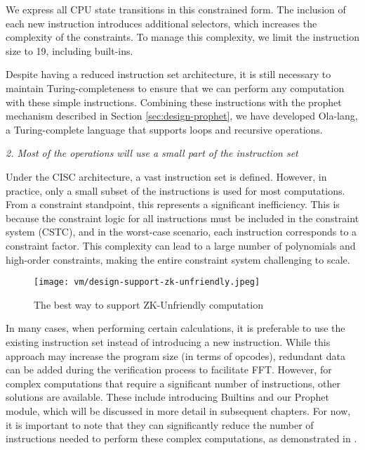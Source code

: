 We express all CPU state transitions in this constrained form. The inclusion of each new instruction introduces additional selectors, which increases the complexity of the constraints. 
To manage this complexity, we limit the instruction size to 19, including built-ins.

Despite having a reduced instruction set architecture, it is still necessary to maintain Turing-completeness to ensure that we can perform any computation with these simple instructions. 
Combining these instructions with the prophet mechanism described in Section \ref{sec:design-prophet}, we have developed Ola-lang, a Turing-complete language that supports loops and recursive operations.


\emph{2. Most of the operations will use a small part of the instruction set}

Under the CISC architecture, a vast instruction set is defined. However, in practice, only a small subset of the instructions is used for most computations. From a constraint standpoint, this represents a significant inefficiency. 
This is because the constraint logic for all instructions must be included in the constraint system (CSTC), and in the worst-case scenario, each instruction corresponds to a constraint factor. 
This complexity can lead to a large number of polynomials and high-order constraints, making the entire constraint system challenging to scale.

\begin{figure}[!ht]
    \centering
    \texttt{[image: vm/design-support-zk-unfriendly.jpeg]}
    \caption{The best way to support ZK-Unfriendly computation}
    \label{fig:desgin-support-zk-unfriendly}
\end{figure}

In many cases, when performing certain calculations, it is preferable to use the existing instruction set instead of introducing a new instruction.
While this approach may increase the program size (in terms of opcodes), redundant data can be added during the verification process to facilitate FFT. 
However, for complex computations that require a significant number of instructions, other solutions are available. These include introducing Builtins and our Prophet module, which will be discussed in more detail in subsequent chapters. 
For now, it is important to note that they can significantly reduce the number of instructions needed to perform these complex computations, as demonstrated in .